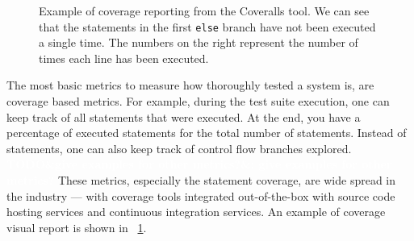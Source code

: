 \documentclass[a4paper,11pt]{sdm_internship}
\newcommand{\todo}[1]{\colorbox{Red!75}{\textcolor{white}{\textbf{TODO\ifx&#1&\else: #1\fi}}}}
\theoremstyle{definition}
\begin{document}
\begin{figure}
  \centering
  \cprotect\caption{Example of coverage reporting from the Coveralls\protect\footnotemark{} tool. We can see that the statements in the first \texttt{else} branch have not been executed a single time. The numbers on the right represent the number of times each line has been executed.}%
  \label{fig:screenshot_coverage}
\end{figure}

The most basic metrics to measure how thoroughly tested a system is, are coverage based metrics.
For example, during the test suite execution, one can keep track of all statements that were executed.
At the end, you have a percentage of executed statements for the total number of statements.
Instead of statements, one can also keep track of control flow branches explored.
\todo{give examples for other metrics?}
These metrics, especially the statement coverage, are wide spread in the industry --- with coverage tools integrated out-of-the-box with source code hosting services and continuous integration services.
An example of coverage visual report is shown in \figurename~\ref{fig:screenshot_coverage}.
\end{document}
